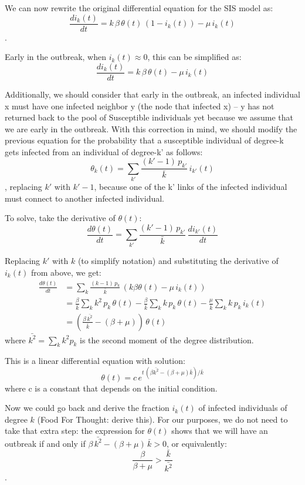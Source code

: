 \documentclass[11pt]{scrartcl} %
\begin{document}
We can now rewrite the original differential equation for the SIS model as:
\[ \frac{di_k(t)}{dt} = k \, \beta \, \theta(t) \, (1-i_k(t)) - \mu \, i_k(t) \].

Early in the outbreak, when $i_k(t) \approx 0$, this can be simplified as: 
\[ \frac{di_k(t)}{dt} = k \, \beta \, \theta(t) - \mu \, i_k(t) \] 

Additionally, we should consider that early in the outbreak, an infected individual x must have one infected neighbor y (the node that infected x) -- y has not returned back to the pool of Susceptible individuals yet because we assume that we are early in the outbreak. With this correction in mind,  we should modify the previous equation for the probability that a susceptible individual of degree-k gets infected from an individual of degree-k' as follows:
\[\theta_k(t) = \sum_{k'} \frac{(k'-1) \, p_{k'}}{\bar{k}} \, i_{k'}(t)\]
, replacing $k'$ with $k'-1$, because one of the k' links of the infected individual must connect to another infected individual. 

To solve, take the derivative of $\theta(t)$:
\[\frac{d \theta(t)}{dt} = \sum_{k'} \frac{(k' -1)\, p_{k'}}{\bar{k}} \, \frac{di_{k'}(t)}{dt}\]

Replacing $k'$ with $k$ (to simplify notation) and substituting the derivative of $i_k(t)$ from above, we get:
\begin{align*}
\frac{d \theta(t)}{dt} &= \sum_{k} \frac{(k-1) \, p_k}{\bar{k}} \, \left(k \beta \theta(t) - \mu\, i_k(t)\right) \\
&= \frac{\beta}{\bar{k}} \sum_{k} k^2 \, p_k \, \theta(t) - \frac{\beta}{\bar{k}} \sum_{k} k \, p_k \, \theta(t)- \frac{\mu}{\bar{k}} \sum_{k} k \, p_k \, i_k(t) \\
&= (\frac{\beta \, \bar{k^2}}{\bar{k}} - (\beta+\mu)) \, \theta(t)
\end{align*}
where $\bar{k^2} = \sum_k k^2 p_k$ is the second moment of the degree distribution.

This is a linear differential equation with solution:
\[ \theta(t) = c \, e^{t \, (\beta \bar{k^2} - (\beta+\mu) \bar{k})/\bar{k}} \]
where c is a constant that depends on the initial condition.

Now we could go back and derive the fraction $i_k(t)$ of infected individuals of degree $k$ (Food For Thought: derive this). For our purposes, we do not need to take that extra step: the expression for $\theta(t)$ shows that we will have an outbreak if and only if $\beta \, \bar{k^2} - (\beta+\mu)\, \bar{k}  > 0$, or equivalently: 
\[ \frac{\beta}{\beta+\mu} > \frac{\bar{k}}{\bar{k^2}} \].
\end{document}
